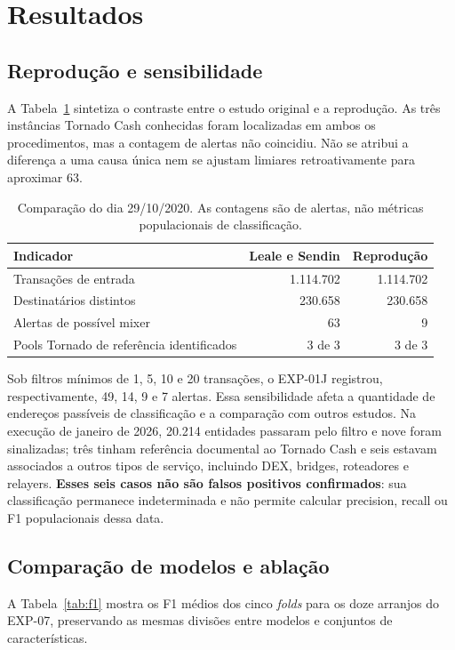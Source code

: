 \documentclass[12pt]{article}
\begin{document}
\section{Resultados}
\subsection{Reprodução e sensibilidade}
A Tabela~\ref{tab:replica} sintetiza o contraste entre o estudo original e a reprodução. As três instâncias Tornado Cash conhecidas foram localizadas em ambos os procedimentos, mas a contagem de alertas não coincidiu. Não se atribui a diferença a uma causa única nem se ajustam limiares retroativamente para aproximar 63.

\begin{table}[ht]
\centering\small
\caption{Comparação do dia 29/10/2020. As contagens são de alertas, não métricas populacionais de classificação.}
\label{tab:replica}
\begin{tabular}{lrr}
\toprule
Indicador & Leale e Sendin & Reprodução \\
\midrule
Transações de entrada & 1.114.702 & 1.114.702 \\
Destinatários distintos & 230.658 & 230.658 \\
Alertas de possível mixer & 63 & 9 \\
Pools Tornado de referência identificados & 3 de 3 & 3 de 3 \\
\bottomrule
\end{tabular}
\end{table}

Sob filtros mínimos de 1, 5, 10 e 20 transações, o EXP-01J registrou, respectivamente, 49, 14, 9 e 7 alertas. Essa sensibilidade afeta a quantidade de endereços passíveis de classificação e a comparação com outros estudos. Na execução de janeiro de 2026, 20.214 entidades passaram pelo filtro e nove foram sinalizadas; três tinham referência documental ao Tornado Cash e seis estavam associados a outros tipos de serviço, incluindo DEX, bridges, roteadores e relayers. \textbf{Esses seis casos não são falsos positivos confirmados}: sua classificação permanece indeterminada e não permite calcular precision, recall ou F1 populacionais dessa data.

\subsection{Comparação de modelos e ablação}
A Tabela~\ref{tab:f1} mostra os F1 médios dos cinco \emph{folds} para os doze arranjos do EXP-07, preservando as mesmas divisões entre modelos e conjuntos de características.
\end{document}
